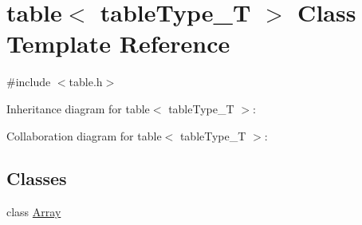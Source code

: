 \hypertarget{classtable}{
\section{table$<$ tableType\_\-T $>$ Class Template Reference}
\label{classtable}
}


{\ttfamily \#include $<$table.h$>$}



Inheritance diagram for table$<$ tableType\_\-T $>$:


Collaboration diagram for table$<$ tableType\_\-T $>$:
\subsection*{Classes}
\begin{DoxyCompactItemize}
\item 
class \hyperlink{classtable_1_1Array}{Array}
\end{DoxyCompactItemize}
